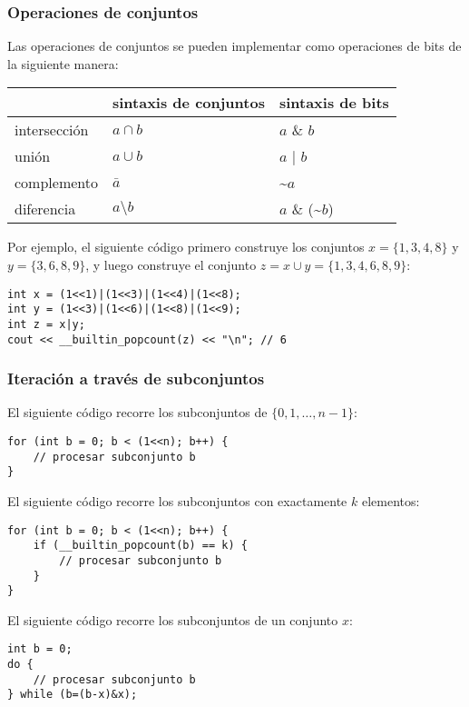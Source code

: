 \subsubsection{Operaciones de conjuntos}

Las operaciones de conjuntos se pueden implementar como operaciones de bits de la siguiente manera:

\begin{center}
\begin{tabular}{lll}
& sintaxis de conjuntos & sintaxis de bits \\
\hline
intersección & $a \cap b$ & $a$ \& $b$ \\
unión & $a \cup b$ & $a$ | $b$ \\
complemento & $\bar a$ & \textasciitilde$a$ \\
diferencia & $a \setminus b$ & $a$ \& (\textasciitilde$b$) \\
\end{tabular}
\end{center}

Por ejemplo, el siguiente código primero construye
los conjuntos $x=\{1,3,4,8\}$ y $y=\{3,6,8,9\}$,
y luego construye el conjunto $z = x \cup y = \{1,3,4,6,8,9\}$:

\begin{lstlisting}
int x = (1<<1)|(1<<3)|(1<<4)|(1<<8);
int y = (1<<3)|(1<<6)|(1<<8)|(1<<9);
int z = x|y;
cout << __builtin_popcount(z) << "\n"; // 6
\end{lstlisting}

\subsubsection{Iteración a través de subconjuntos}

El siguiente código recorre
los subconjuntos de $\{0,1,\ldots,n-1\}$:

\begin{lstlisting}
for (int b = 0; b < (1<<n); b++) {
    // procesar subconjunto b
}
\end{lstlisting}
El siguiente código recorre
los subconjuntos con exactamente $k$ elementos:
\begin{lstlisting}
for (int b = 0; b < (1<<n); b++) {
    if (__builtin_popcount(b) == k) {
        // procesar subconjunto b
    }
}
\end{lstlisting}
El siguiente código recorre los subconjuntos
de un conjunto $x$:
\begin{lstlisting}
int b = 0;
do {
    // procesar subconjunto b
} while (b=(b-x)&x);
\end{lstlisting}

